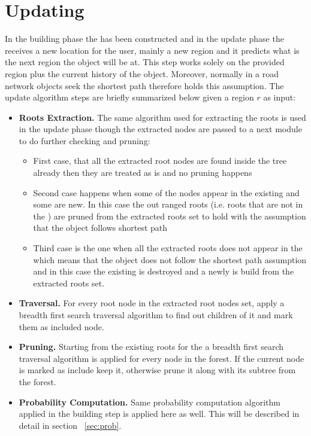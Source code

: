 \section {Updating \PF}
In the building phase the \pf has been constructed and in the update phase the \pf receives a new location for the user, mainly a new region and it predicts what is the next region the object will be at. This step works solely on the provided region plus the current history of the object. Moreover, normally in a road network objects seek the shortest path therefore \pf holds this assumption. The update algorithm steps are briefly summarized below given a region $r$ as input:
\begin{itemize}
    \item {\bf Roots Extraction.} The same algorithm used for extracting the roots is used in the update phase though the extracted nodes are passed to a next module to do further checking and pruning:
    \begin{itemize}
    \item First case, that all the extracted root nodes are found inside the tree already then they are treated as is and no pruning happens 
    \item Second case happens when some of the nodes appear in the existing \pf and some are new. In this case the out ranged roots (i.e. roots that are not in the \pf) are pruned from the extracted roots set to hold with the assumption that the object follows shortest path
    \item Third case is the one when all the extracted roots does not appear in the \pf which means that the object does not follow the shortest path assumption and in this case the existing \pf is destroyed and a newly \pf is build from the extracted roots set.
    \end{itemize}
    \item {\bf \PF Traversal.} For every root node in the extracted root nodes set, apply a breadth first search traversal algorithm to find out children of it and mark them as included node.
    \item {\bf \PF Pruning.} Starting from the existing roots for the \pf a breadth first search traversal algorithm is applied for every node in the forest. If the current node is marked as include keep it, otherwise prune it along with its subtree from the forest.
    \item {\bf Probability Computation.} Same probability computation algorithm applied in the \pf building step is applied here as well. This will be described in detail in section ~\ref{sec:prob}.
\end{itemize}

